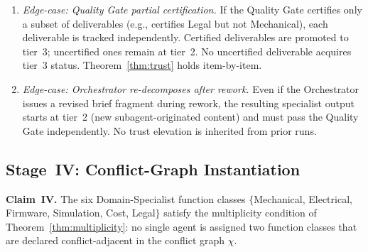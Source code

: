 \documentclass[12pt]{article}
\theoremstyle{definition}
\begin{document}
\begin{enumerate}
    \item[III.4] \emph{Edge-case: Quality Gate partial certification.}
                 If the Quality Gate certifies only a subset of
                 deliverables (e.g., certifies Legal but not
                 Mechanical), each deliverable is tracked
                 independently.  Certified deliverables are promoted
                 to tier~3; uncertified ones remain at tier~2.
                 No uncertified deliverable acquires tier~3 status.
                 Theorem~\ref{thm:trust} holds item-by-item. \checkmark

    \item[III.5] \emph{Edge-case: Orchestrator re-decomposes after
                 rework.}  Even if the Orchestrator issues a revised
                 brief fragment during rework, the resulting specialist
                 output starts at tier~2 (new subagent-originated
                 content) and must pass the Quality Gate independently.
                 No trust elevation is inherited from prior runs.
                 \checkmark
\end{enumerate}

\subsection{Stage~IV: Conflict-Graph Instantiation}
\label{sec:case-study-conflict}

\noindent\textbf{Claim~IV.}  The six Domain-Specialist function
classes $\{$Mechanical, Electrical, Firmware, Simulation, Cost,
Legal$\}$ satisfy the multiplicity condition of
Theorem~\ref{thm:multiplicity}: no single agent is assigned two
function classes that are declared conflict-adjacent in the conflict
graph $\chi$.
\end{document}

